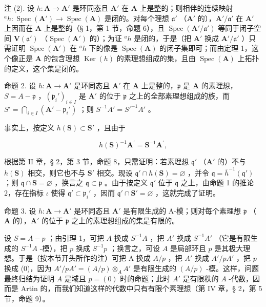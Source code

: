 注 (2). 设 \(h \colon \mathbf{A} \to \mathbf{A}'\) 是环同态且 \(\mathbf{A}'\) 在 \(\mathbf{A}\) 上是整的；则相伴的连续映射 \(^a h \colon \operatorname{Spec}(\mathbf{A}') \to \operatorname{Spec}(\mathbf{A})\) 是闭的。对每个理想 \(\mathfrak{a}'\) （\(\mathbf{A}'\) 的），\(\mathbf{A}' / \mathfrak{a}'\) 在 \(\mathbf{A}'\) 上因而在 \(\mathbf{A}\) 上是整的（§ 1，第 1 节，命题 6），且 \(\operatorname{Spec}(\mathbf{A}' / \mathfrak{a}')\) 等同于闭子空间 \(\mathbf{V}(\mathfrak{a}')\) （\(\operatorname{Spec}(\mathbf{A}')\) 的）；为证 \(^a h\) 是闭的，于是（把 \(\mathbf{A}'\) 换成 \(\mathbf{A}' / \mathfrak{a}'\) ）只需证明 \(\operatorname{Spec}(\mathbf{A}')\) 在 \(^a h\) 下的像是 \(\operatorname{Spec}(\mathbf{A})\) 的闭子集即可；而由定理 1，这个像正是 \(\mathbf{A}\) 的包含理想 \(\operatorname{Ker}(h)\) 的素理想组成的集，且由 \(\operatorname{Spec}(\mathbf{A})\) 上拓扑的定义，这个集是闭的。

命题 2. 设 \(h: \mathbf{A} \to \mathbf{A}'\) 是环同态且 \(\mathbf{A}'\) 在 \(\mathbf{A}\) 上是整的，\(\mathfrak{p}\) 是 \(\mathbf{A}\) 的素理想，\(S = A - \mathfrak{p}\) ，\((\mathfrak{p}_i')_{i \in I}\) 是 \(\mathbf{A}'\) 的位于 \(\mathfrak{p}\) 之上的全部素理想组成的族，而 \(S' = \bigcap_{i \in I} (\mathbf{A}' - \mathfrak{p}_i')\) ；则 \(S^{-1}A' = S'^{-1}A'\) 。

事实上，按定义 \(h(\mathbf{S}) \subset \mathbf{S}'\) ，且由于

\[
h (\mathbf {S}) ^ {- 1} \mathbf {A} ^ {\prime} = \mathbf {S} ^ {- 1} \mathbf {A} ^ {\prime},
\]

根据第 II 章，§ 2，第 3 节，命题 8，只需证明：若素理想 \(\mathfrak{q}'\) （\(\mathbf{A}'\) 的）不与 \(h(\mathbf{S})\) 相交，则它也不与 \(\mathbf{S}'\) 相交。现设 \(\mathfrak{q}' \cap h(\mathbf{S}) = \varnothing\) ，并令 \(\mathfrak{q} = \bar{h}^{-1}(\mathfrak{q}')\) ；则 \(\mathfrak{q} \cap \mathbf{S} = \varnothing\) ，换言之 \(\mathfrak{q} \subset \mathfrak{p}\) 。由于按定义 \(\mathfrak{q}'\) 位于 \(\mathfrak{q}\) 之上，由命题 1 的推论 2，存在指标 \(\iota\) 使得 \(\mathfrak{q}' \subset \mathfrak{p}_i'\) ，因而 \(\mathfrak{q}' \cap \mathbf{S}' = \varnothing\) ，这就完成了证明。

命题 3. 设 \(h: \mathbf{A} \to \mathbf{A}'\) 是环同态且 \(\mathbf{A}'\) 是有限生成的 A-模；则对每个素理想 \(\mathfrak{p}\) （\(\mathbf{A}\) 的），\(\mathbf{A}'\) 的位于 \(\mathfrak{p}\) 之上的素理想组成的集是有限的。

设 \(S = A - p\) ；由引理 1，可把 \(A\) 换成 \(S^{-1}A\) ，把 \(A'\) 换成 \(S^{-1}A'\) （它是有限生成的 \(S^{-1}A\) -模），把 \(p\) 换成 \(S^{-1}p\) ；换言之，可设 \(A\) 是局部环且 \(p\) 是其极大理想。于是（按本节开头所作的注）可把 A 换成 \(A/p\) ，把 \(A'\) 换成 \(A'/pA'\) ，把 \(p\) 换成 (0)，因为 \(A'/pA' = (A/p) \otimes_A A'\) 是有限生成的 \((A/p)\) -模。这样，问题最终归结为证明 \(A\) 是域且 \(p = (0)\) 时的命题；此时 \(A'\) 是有限秩的 \(A\) -代数，因而是 Artin 的，而我们知道这样的代数中只有有限个素理想（第 IV 章，§ 2，第 5 节，命题 9）。

